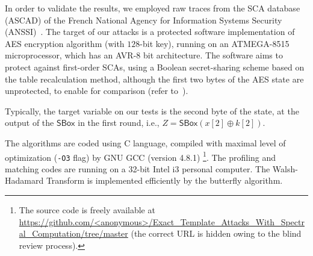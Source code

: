 \documentclass[conference,twocolumn]{IEEEtran}
\begin{document}
  
In order to validate the results, we employed raw traces from the SCA database (ASCAD) of the French National Agency for Information Systems Security (ANSSI)~\cite{emmanuel2018study}.
The target of our attacks is a protected software implementation of AES encryption algorithm (with $128$-bit key), running on an \textsc{ATMEGA-8515} microprocessor, which has an \textsc{AVR-8} bit architecture. 
The software aims to protect against first-order SCAs, using a Boolean secret-sharing scheme based on the table recalculation method, although the first two bytes of the AES state are unprotected, to enable for comparison (refer to~\cite[\S2.5.1]{emmanuel2018study}).

Typically, the target variable on our tests is the second byte of the state, at the output of the $\mathsf{SBox}$ in the first round, i.e., $Z = \mathsf{SBox} (x[2] \oplus k[2])$.

The algorithms %
are coded using C language, compiled with maximal level of optimization (\texttt{-O3} flag) by GNU GCC (version 4.8.1)%
\footnote{The source code is freely available at 
\url{https://github.com/<anonymous>/Exact_Template_Attacks_With_Spectral_Computation/tree/master} (the correct URL is hidden owing to the blind review process).}.
The profiling and matching codes are running on a 32-bit Intel i3 personal computer.
The Walsh-Hadamard Transform is implemented efficiently by the butterfly algorithm.



\end{document}
